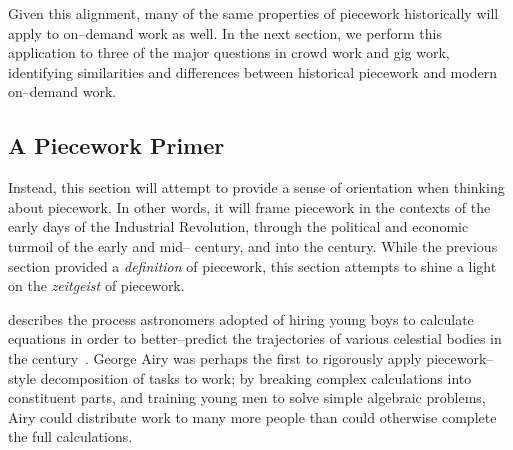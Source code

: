 \documentclass[trackingWork]{subfiles}
\begin{document}
Given this alignment, many of the same properties of piecework historically will apply to on--demand work as well. In the next section, we perform this application to three of the major questions in crowd work and gig work, identifying similarities and differences between historical piecework and modern on--demand work.





\subsection{A Piecework Primer}\label{sec:pieceworkPrimer} %
Instead, this section will attempt to provide a sense of orientation when thinking about piecework.
In other words, it will frame piecework in the contexts of
the early days of the Industrial Revolution,
through the political and economic turmoil of the early and mid-- century,
and into the  century.
While the previous section provided a \textit{definition} of piecework,
this section attempts to shine a light on the \textit{zeitgeist} of piecework.


\citeauthor{grier2013computers} describes the process astronomers adopted of hiring young boys
to calculate equations in order
to better--predict the trajectories of various celestial bodies in the  century~\cite{grier2013computers}.
George Airy was perhaps the first to rigorously apply piecework--style decomposition of tasks to work;
by breaking complex calculations into constituent parts, and
training young men to solve simple algebraic problems,
Airy could distribute work to many more people than could otherwise complete the full calculations.

\end{document}
